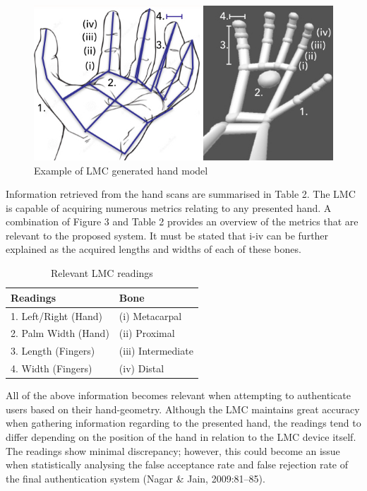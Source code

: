 
  
\begin{figure}[htbp!] 
\centering    
\includegraphics[width=1.0\textwidth]{Chapter2/Figs/Example_of_LMC_generated_hand_model.jpeg}
\caption[Example of LMC generated hand model]{Example of LMC generated hand model}
\label{fig:Example of LMC generated hand model}
\end{figure}


Information retrieved from the hand scans are summarised in Table 2. The LMC is capable of acquiring numerous metrics relating to any presented hand. A combination of Figure 3 and Table 2 provides an overview of the metrics that are relevant to the proposed system. It must be stated that i-iv can be further explained as the acquired lengths and widths of each of these bones.

\begin{table}[h!]
\caption{Relevant LMC readings}
\centering
 \begin{tabular}{|p{} | p{}|} 
 \hline
	\textbf{Readings} & \textbf{Bone} \\ [1ex] 
 \hline\hline 
 1.	Left/Right (Hand) & (i) Metacarpal \\[1ex]
 \hline 
 2.	Palm Width (Hand) & (ii) Proximal \\[1ex]
 \hline
 3.	Length (Fingers) & (iii) Intermediate \\ [1ex] 
 \hline
 4.	Width (Fingers) & (iv) Distal \\ [1ex] 
 \hline
 \end{tabular}
\end{table}


All of the above information becomes relevant when attempting to authenticate users based on their hand-geometry. Although the LMC maintains great accuracy when gathering information regarding to the presented hand, the readings tend to differ depending on the position of the hand in relation to the LMC device itself. The readings show minimal discrepancy; however, this could become an issue when statistically analysing the false acceptance rate and false rejection rate of the final authentication system (Nagar \& Jain, 2009:81–85).


